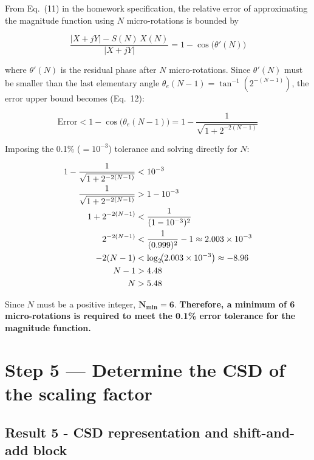\documentclass[12pt,a4paper]{report}
\begin{document}
From Eq.~(11) in the homework specification, the relative error of approximating the magnitude function using $N$ micro-rotations is bounded by

\begin{equation}
\frac{|X+jY| - S(N)\,X(N)}{|X+jY|}
= 1 - \cos\!\bigl(\theta'(N)\bigr)
\end{equation}

where $\theta'(N)$ is the residual phase after $N$ micro-rotations. Since $\theta'(N)$ must be smaller than the last elementary angle $\theta_e(N-1) = \tan^{-1}(2^{-(N-1)})$, the error upper bound becomes (Eq.~12):

\begin{equation}
\text{Error} < 1 - \cos\!\bigl(\theta_e(N-1)\bigr)
= 1 - \frac{1}{\sqrt{1 + 2^{-2(N-1)}}}
\end{equation}

Imposing the 0.1\% ($= 10^{-3}$) tolerance and solving directly for $N$:

\begin{align}
1 - \frac{1}{\sqrt{1 + 2^{-2(N-1)}}} &< 10^{-3} \notag \\
\frac{1}{\sqrt{1 + 2^{-2(N-1)}}} &> 1 - 10^{-3} \notag \\
1 + 2^{-2(N-1)} &< \frac{1}{(1-10^{-3})^{2}} \notag \\
2^{-2(N-1)} &< \frac{1}{(0.999)^{2}} - 1 \approx 2.003 \times 10^{-3} \notag \\
-2(N-1) &< \log_{2}\!\bigl(2.003\times10^{-3}\bigr) \approx -8.96 \notag \\
N - 1 &> 4.48 \notag \\
N &> 5.48
\end{align}

Since $N$ must be a positive integer, $\mathbf{N_{\min} = 6}$.
\textbf{Therefore, a minimum of 6 micro-rotations is required to meet the 0.1\% error tolerance for the magnitude function.}

\newpage

\chapter{Step 5 — Determine the CSD of the scaling factor}
\section{Result 5 - CSD representation and shift-and-add block}
\end{document}

